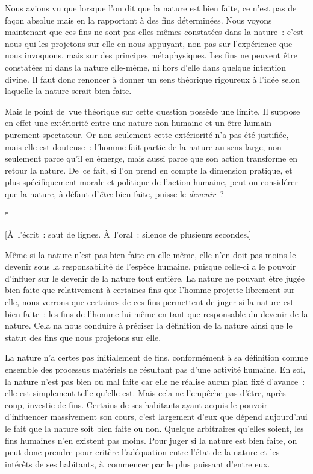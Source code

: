 \documentclass[a4paper,12pt]{report}
\begin{document}
Nous avions vu que lorsque l'on dit que
la nature est bien faite, ce n'est pas de façon absolue mais en la
rapportant à des fins déterminées. Nous voyons maintenant que ces fins
ne sont pas elles-mêmes constatées dans la nature : c'est nous qui les
projetons sur elle en nous appuyant, non pas sur l'expérience que nous
invoquons, mais sur des principes métaphysiques. Les fins ne peuvent
être constatées ni dans la nature elle-même, ni hors d'elle dans quelque
intention divine. Il faut donc renoncer à donner un sens théorique
rigoureux à l'idée selon laquelle la nature serait bien faite.

Mais le point de vue théorique sur cette question
possède une limite. Il suppose en effet une extériorité entre une nature
non-humaine et un être humain purement spectateur. Or non seulement
cette extériorité n'a pas été justifiée, mais elle est douteuse :
l'homme fait partie de la nature au sens large, non seulement parce
qu'il en émerge, mais aussi parce que son action transforme en retour la
nature. De ce fait, si l'on prend en compte la dimension pratique, et
plus spécifiquement morale et politique de l'action humaine, peut-on
considérer que la nature, à défaut d'\emph{être} bien faite, puisse le
\emph{devenir} ?

\begin{center}
*

[À l'écrit : saut de lignes. À l'oral : silence de plusieurs secondes.]
\end{center}

Même si la nature n'est pas bien faite en
elle-même, elle n'en doit pas moins le devenir sous la responsabilité de
l'espèce humaine, puisque celle-ci a le pouvoir d'influer sur le devenir
de la nature tout entière. La nature ne pouvant être jugée bien faite
que relativement à certaines fins que l'homme projette librement sur
elle, nous verrons que certaines de ces fins permettent de juger si la
nature est bien faite : les fins de l'homme lui-même en tant que
responsable du devenir de la nature. Cela na nous conduire à préciser la
définition de la nature ainsi que le statut des fins que nous projetons
sur elle.

La nature n'a certes pas initialement de fins,
conformément à sa définition comme ensemble des processus matériels ne
résultant pas d'une activité humaine. En soi, la nature n'est pas bien
ou mal faite car elle ne réalise aucun plan fixé d'avance : elle est
simplement telle qu'elle est. Mais cela ne l'empêche pas d'être, après
coup, investie de fins. Certains de ses habitants ayant acquis le
pouvoir d'influencer massivement son cours,
c'est largement d'eux que dépend aujourd'hui le fait que la nature soit
bien faite ou non. Quelque arbitraires qu'elles soient, les fins
humaines n'en existent pas moins. Pour juger
si la nature est bien faite, on peut donc prendre pour critère
l'adéquation entre l'état de la nature et les intérêts de ses habitants,
à commencer par le plus puissant d'entre eux.
\end{document}
